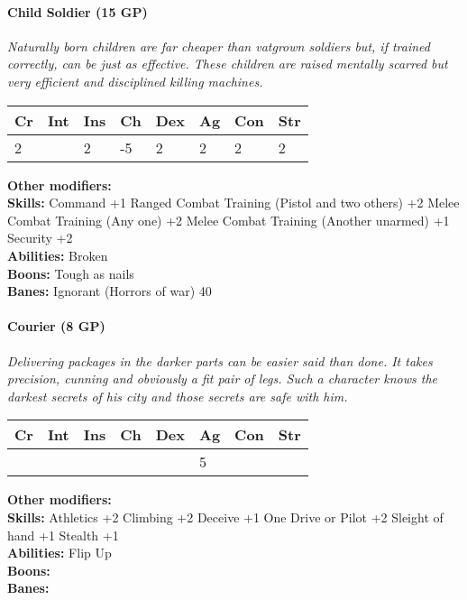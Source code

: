 \documentclass[12pt,a4paper,openany]{book}
\begin{document}
	\paragraph*{Child Soldier (15 GP)}
	\textit{Naturally born children are far cheaper than vatgrown soldiers but, if trained correctly, can be just as effective. These children are raised mentally scarred but very efficient and disciplined killing machines.}\par
	\begin{tabular}{|l|l|l|l|l|l|l|l|}
		\hline
		Cr & Int & Ins & Ch & Dex & Ag & Con & Str \\ \hline
		2 &  & 2 & -5 & 2 & 2 & 2 & 2 \\ \hline
	\end{tabular}\par
	\noindent\textbf{Other modifiers:} \\
	\textbf{Skills:} Command +1
	Ranged Combat Training (Pistol and two others) +2
	Melee Combat Training (Any one) +2
	Melee Combat Training (Another unarmed) +1
	Security +2\\
	\textbf{Abilities:} Broken\\
	\textbf{Boons:} Tough as nails\\
	\textbf{Banes:} Ignorant (Horrors of war) 40\\
	
	\hrulefill
	\paragraph*{Courier (8 GP)}
	\textit{Delivering packages in the darker parts can be easier said than done. It takes precision, cunning and obviously a fit pair of legs. Such a character knows the darkest secrets of his city and those secrets are safe with him.}\par
	\begin{tabular}{|l|l|l|l|l|l|l|l|}
		\hline
		Cr & Int & Ins & Ch & Dex & Ag & Con & Str \\ \hline
		&  &  &  &  & 5 &  &  \\ \hline
	\end{tabular}\par
	\noindent\textbf{Other modifiers:} \\
	\textbf{Skills:} Athletics +2
	Climbing +2
	Deceive +1
	One Drive or Pilot +2
	Sleight of hand +1
	Stealth +1\\
	\textbf{Abilities:} Flip Up\\
	\textbf{Boons:} \\
	\textbf{Banes:} \\
	
\end{document}
